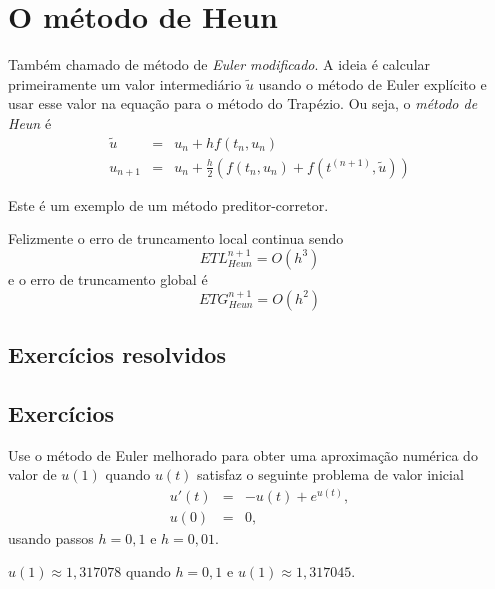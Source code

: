 \emconstrucao


\section{O método de Heun}
Também chamado de método de \emph{Euler modificado}. A ideia é calcular primeiramente um valor intermediário $\tilde{u}$ usando o método de Euler expl\'icito e usar esse valor na equação para o método do Trapézio. Ou seja, o \emph{método de Heun} é
\begin{eqnarray}
  \tilde{u} &=& u_n +   h f(t_n,u_n) \\
  u_{n+1}   &=& u_n +  \frac{h}{2} \left(f(t_n,u_n)+f(t^{(n+1)},\tilde{u})\right)
\end{eqnarray}

Este é um exemplo de um método preditor-corretor.

Felizmente o erro de truncamento local continua sendo
$$ETL_{Heun}^{n+1}= O(h^3)$$
e o erro de truncamento global é
$$ETG_{Heun}^{n+1}= O(h^2)$$


\subsection*{Exercícios resolvidos}

\emconstrucao

\subsection*{Exercícios}

\begin{exer} Use o método de Euler melhorado para obter uma aproximação numérica do valor de $u(1)$ quando $u(t)$ satisfaz o seguinte problema de valor inicial
\begin{eqnarray*}
 u'(t)&=&-u(t)+ e^{u(t)},\\
 u(0)&=&0,
\end{eqnarray*}
usando passos $h=0,1$ e $h=0,01$.
\end{exer}
\begin{resp}
 $u(1)\approx 1,317078$ quando $h=0,1$ e $u(1)\approx 1,317045$.
\end{resp}


